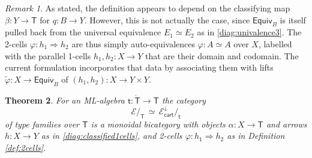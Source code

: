 \documentclass[12pt,reqno]{amsart}
\newcommand{\EE}{\ensuremath{\mathcal{E}}}
\renewcommand{\to}{\ensuremath{\rightarrow}}
\renewcommand{\t}{\ensuremath{\mathsf{t}}}
\newcommand{\T}{\ensuremath{\mathsf{T}}}
\newcommand{\TT}{\ensuremath{\dot{\mathsf{T}}}}
\newtheorem{theorem}{Theorem}
\newtheorem{lemma}[theorem]{Lemma}
\theoremstyle{remark}
\newtheorem{remark}[theorem]{Remark}
\theoremstyle{definition}
\begin{document}
\begin{remark}\label{2cellsareglobal}
As stated, the definition appears to depend on the classifying map $\beta : Y\to \T$ for $q:B\to Y$. However,  this is not actually the case,
since $\mathsf{Equiv}_B$ is itself pulled back from the universal equivalence $E_1\simeq E_2$ as in \eqref{diag:univalence3}.  The 2-cells $\varphi : h_1 \Rightarrow h_2$ are thus simply auto-equivalences $\varphi: A \simeq A$ over $X$, labelled with the parallel 1-cells $h_1, h_2 : X \to Y$ that are their domain and codomain. The current formulation incorporates that data by associating them with lifts $\tilde{\varphi} : X \to \mathsf{Equiv}_B$ of $(h_1, h_2) : X \to Y \times Y$. 
\end{remark}

%
% 
 
\begin{theorem}
For an ML-algebra $\t : \TT \to \T$ the category $$\EE/_\T\, \simeq\, \EE^{\downarrow}_{\mathsf{cart}}/_{\t}$$ of type families over $\T$ is a monoidal bicategory with objects $\alpha : X\to \T$ and arrows $h : X \to Y$ as in \eqref{diag:classified1cells}, and 2-cells $\varphi : h_1 \Rightarrow h_2$ as in Definition \ref{def:2cells}.  
\end{theorem}
\end{document}

